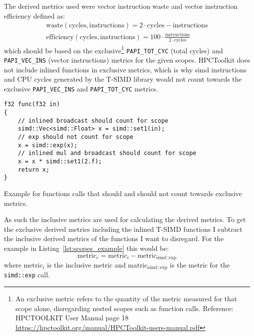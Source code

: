\documentclass[a4paper, 11pt]{memoir}
\begin{document}
    The derived metrics used were vector instruction waste and vector instruction efficiency defined as:
    \begin{align}
        \text{waste}(\text{cycles}, \text{instructions}) = 2 \cdot \text{cycles} - \text{instructions} \label{eq:vec_waste}\\
        \text{efficiency}(\text{cycles}, \text{instructions}) = 100 \cdot \frac{\text{instructions}}{2\cdot\text{cycles}} \label{eq:vec_efficiency}
    \end{align}
    which should be based on the exclusive\footnote{An exclusive metric refers to the quantity of the metric measured for that scope
    alone, disregarding nested scopes such as function calls. Reference: HPCTOOLKIT User Manual page 18
    \href{https://hpctoolkit.org/manual/HPCToolkit-users-manual.pdf}{https://hpctoolkit.org/manual/HPCToolkit-users-manual.pdf}}
    \texttt{PAPI_TOT_CYC} (total cycles) and \texttt{PAPI_VEC_INS}
    (vector instructions) metrics for the given scopes. HPCToolkit does not include inlined functions in exclusive metrics, which is why \gls{simd}
    instructions and CPU cycles generated by the T-SIMD library would not count towards the exclusive \texttt{PAPI_VEC_INS} and \texttt{PAPI_TOT_CYC}
    metrics.

    \begin{listing}[H]
        \begin{verbatim}
f32 func(f32 in)
{
    // inlined broadcast should count for scope
    simd::Vec<simd::Float> x = simd::set1(in);
    // exp should not count for scope
    x = simd::exp(x);
    // inlined mul and broadcast should count for scope
    x = x * simd::set1(2.f);
    return x;
}
        \end{verbatim}
        \caption{Example for functions calls that should and should not count towards exclusive metrics.}
        \label{lst:scopes_example}
    \end{listing}

    As such the inclusive metrics are used for calculating the derived metrics. To get the exclusive derived metrics including the inlined T-SIMD functions I subtract
    the inclusive derived metrics of the functions I want to disregard. For the example in Listing~\ref{lst:scopes_example}
    this would be:
    \[ \text{metric}_e = \text{metric}_i - \text{metric}_{\text{simd::exp}} \]
    where $\text{metric}_i$ is the inclusive metric and $\text{matric}_{\text{simd::exp}}$ is the metric for the \texttt{simd::exp} call.
\end{document}
